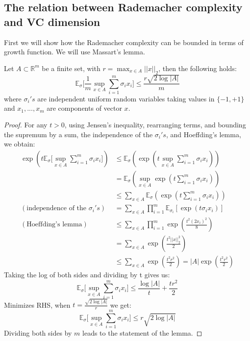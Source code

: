 \subsection{The relation between Rademacher complexity and VC dimension}
First we will show how the Rademacher complexity can be bounded in terms of growth function. We will use Massart's lemma.
\begin{theorem}
	Let $A \subset {\mathbb{R}}^m$ be a finite set, with $r=\max_{x\in A}||x||_2$, then the following holds:
	\begin{equation}
	\mathbb{E}_{\sigma} \big[\frac{1}{m}\sup_{x\in A}\sum_{i=1}^{m}\sigma_ix_i\big] \leq \frac{r\sqrt{2\log|A|}}{m}
	\end{equation}
	where $\sigma_i's$ are independent uniform random variables taking values in $\{-1,+1\}$ and $x_1,...,x_m$ are components of vector $x$.
\end{theorem}
\begin{proof}
	For any $t>0$, using Jensen's inequality, rearranging terms, and bounding the supremum by a sum, the independence of the $\sigma_i's$, and Hoeffding's lemma, we obtain:
	\begin{align}
	\exp\left(t\mathbb{E}_{\sigma} \big[\sup_{x\in A}\sum_{i=1}^{m}\sigma_ix_i \big]\right) &\leq \mathbb{E}_{\sigma}\left( \exp \left(t\sup_{x\in A}\sum_{i=1}^{m}\sigma_ix_i\right)\right) \\
	&= \mathbb{E}_{\sigma}\left(\sup_{x\in A} \exp \left(t\sum_{i=1}^{m}\sigma_ix_i\right)\right)\\
	&\leq \sum_{x\in A} \mathbb{E}_{\sigma}\left(\exp \left(t\sum_{i=1}^{m}\sigma_ix_i\right)\right)\\
	(\text{independence of the }\sigma_i's)&=\sum_{x\in A} \prod_{i=1}^{m}\mathbb{E}_{\sigma_i}[\exp(t\sigma_ix_i)] \\
	(\text{Hoeffding's lemma})&\leq \sum_{x\in A} \prod_{i=1}^{m} \exp\left(\frac{t^2(2x_i)^2}{8}\right)\\
	&= \sum_{x\in A}\exp\left(\frac{t^2||x||_2^2}{2}\right)\\
	&\leq  \sum_{x\in A} \exp\left(\frac{t^2r^2}{2}\right) = |A|\exp\left(\frac{t^2r^2}{2}\right)
	\end{align}
	Taking the log of both sides and dividing by t gives us:
	\begin{equation}
	\mathbb{E}_{\sigma} \big[\sup_{x\in A}\sum_{i=1}^{m}\sigma_ix_i \big] \leq \frac{\log|A|}{t} + \frac{tr^2}{2}
	\end{equation}
	Minimizes RHS, when $t=\frac{\sqrt{2\log|A|}}{r}$ we get:
	\begin{equation}
	\mathbb{E}_{\sigma} \big[\sup_{x\in A}\sum_{i=1}^{m}\sigma_ix_i \big] \leq r\sqrt{2\log|A|}
	\end{equation}
	Dividing both sides by $m$ leads to the statement of the lemma.
\end{proof}
